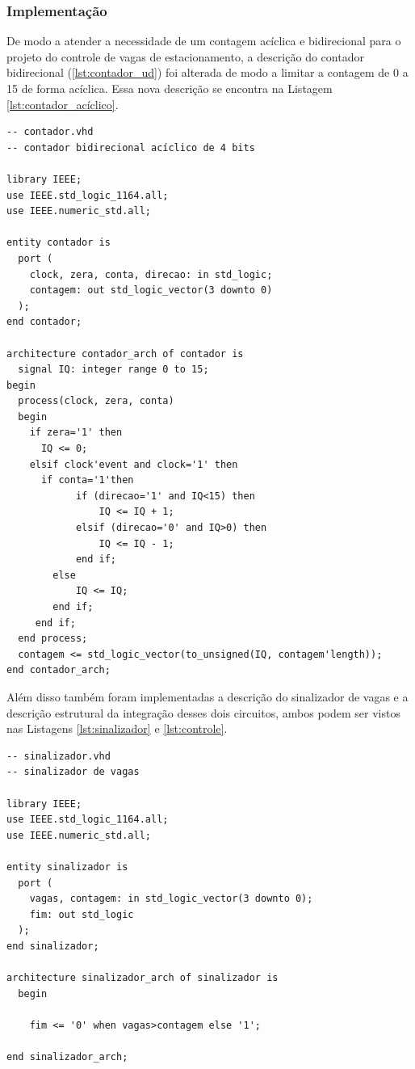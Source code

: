 \documentclass[a4,12pt]{horizon-theme}
\newenvironment{code}{\captionsetup{type=listing}}{}
\begin{document}
\subsubsection{Implementação}

De modo a atender a necessidade de um contagem acíclica e bidirecional para o projeto do controle de vagas de estacionamento, a descrição do contador bidirecional (\ref{lst:contador_ud}) foi alterada de modo a limitar a contagem de 0 a 15 de forma acíclica. Essa nova descrição se encontra na Listagem \ref{lst:contador_acíclico}.

\begin{code}
  \label{lst:contador_acíclico}
  \begin{verbatim}
-- contador.vhd
-- contador bidirecional acíclico de 4 bits

library IEEE;
use IEEE.std_logic_1164.all;
use IEEE.numeric_std.all;

entity contador is
  port (
    clock, zera, conta, direcao: in std_logic;
    contagem: out std_logic_vector(3 downto 0)
  );
end contador;

architecture contador_arch of contador is
  signal IQ: integer range 0 to 15;
begin
  process(clock, zera, conta)
  begin
    if zera='1' then
      IQ <= 0;
    elsif clock'event and clock='1' then    
      if conta='1'then
			if (direcao='1' and IQ<15) then
				IQ <= IQ + 1;
			elsif (direcao='0' and IQ>0) then
				IQ <= IQ - 1;
			end if;
		else
			IQ <= IQ;
		end if;
	 end if;
  end process;
  contagem <= std_logic_vector(to_unsigned(IQ, contagem'length));
end contador_arch;
\end{verbatim}
\end{code}

Além disso também foram implementadas a descrição do sinalizador de vagas e a descrição estrutural da integração desses dois circuitos, ambos podem ser vistos nas Listagens \ref{lst:sinalizador} e \ref{lst:controle}.

\begin{code}
  \label{lst:sinalizador}
  \begin{verbatim}
-- sinalizador.vhd
-- sinalizador de vagas

library IEEE;
use IEEE.std_logic_1164.all;
use IEEE.numeric_std.all;

entity sinalizador is
  port (
    vagas, contagem: in std_logic_vector(3 downto 0);
    fim: out std_logic
  );
end sinalizador;

architecture sinalizador_arch of sinalizador is
  begin
  
	fim <= '0' when vagas>contagem else '1';

end sinalizador_arch;
\end{verbatim}
\end{code}
\end{document}

